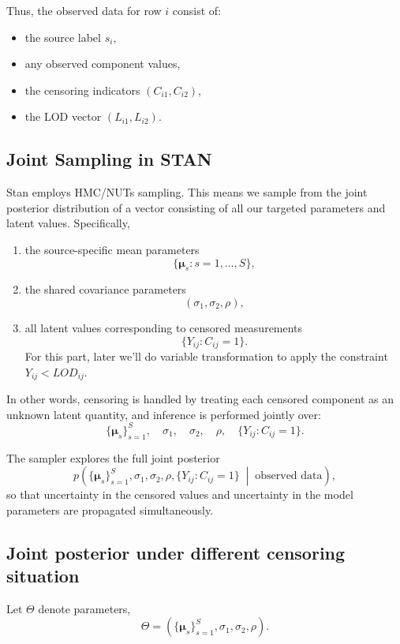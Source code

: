 \documentclass[12pt]{article}
\begin{document}
Thus, the observed data for row \(i\) consist of:
\begin{itemize}
    \item the source label \(s_i\),
    \item any observed component values,
    \item the censoring indicators \((C_{i1},C_{i2})\),
    \item the LOD vector \((L_{i1},L_{i2})\).
\end{itemize}

\subsection{Joint Sampling in STAN}

Stan employs HMC/NUTs sampling. This means we sample from the joint posterior distribution of a vector consisting of all our targeted parameters and latent values. Specifically, 
\begin{enumerate}
    \item the source-specific mean parameters
    \[
    \{\boldsymbol{\mu}_s: s=1,\dots,S\},
    \]
    \item the shared covariance parameters
    \[
    (\sigma_1,\sigma_2,\rho),
    \]
    \item all latent values corresponding to censored measurements
    \[
    \{Y_{ij}:C_{ij}=1\}.
    \]
    For this part, later we'll do variable transformation to apply the constraint $Y_{ij}<LOD_{ij}$.
\end{enumerate}


In other words, censoring is handled by treating each censored component as an unknown latent quantity, and inference is performed jointly over:
\[
\{\boldsymbol{\mu}_s\}_{s=1}^S,\quad \sigma_1,\quad \sigma_2,\quad \rho,\quad
\{Y_{ij}: C_{ij}=1\}.
\]

The sampler explores the full joint posterior
\[
p\!\left(
\{\boldsymbol{\mu}_s\}_{s=1}^S,\sigma_1,\sigma_2,\rho,\{Y_{ij}:C_{ij}=1\}
\;\middle|\;
\text{observed data}
\right),
\]
so that uncertainty in the censored values and uncertainty in the model parameters are propagated simultaneously.


\subsection{Joint posterior under different censoring situation}

Let \(\Theta\) denote parameters,
\[
\Theta
=
\left(
\{\boldsymbol{\mu}_s\}_{s=1}^S,\sigma_1,\sigma_2,\rho
\right).
\]
\end{document}
